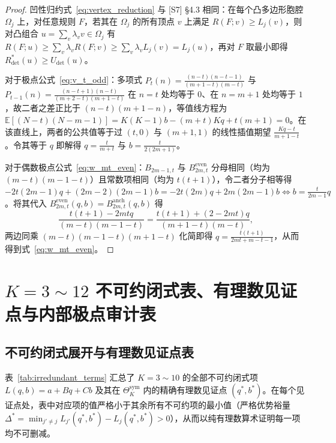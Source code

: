 \documentclass[11pt,a4paper]{article}
\theoremstyle{definition}
\theoremstyle{remark}
\newcommand{\Rdet}{R^*_{\mathrm{det}}}
\newcommand{\Thetasym}{\Theta^{\mathrm{sym}}_K}
\begin{document}
\begin{proof}
凹性归约式~\eqref{eq:vertex_reduction} 与 [S7] §4.3 相同：在每个凸多边形胞腔 $\Omega_j$ 上，对任意规则 $F$，若其在 $\Omega_j$ 的所有顶点 $v$ 上满足 $R(F; v) \ge L_j(v)$，则对凸组合 $u = \sum_v \lambda_v v \in \Omega_j$ 有 $R(F; u) \ge \sum_v \lambda_v R(F; v) \ge \sum_v \lambda_v L_j(v) = L_j(u)$，再对 $F$ 取最小即得 $\Rdet(u) \ge U_{\mathrm{det}}(u)$。

对于极点公式~\eqref{eq:v_t_odd}：多项式 $P_t(n) = \frac{(n-t)(n-t-1)}{(m+1-t)(m-t)}$ 与 $P_{t-1}(n) = \frac{(n-t+1)(n-t)}{(m+2-t)(m+1-t)}$ 在 $n = t$ 处均等于 $0$、在 $n = m+1$ 处均等于 $1$，故二者之差正比于 $(n-t)(m+1-n)$，等值线方程为 $\mathbb{E}[(N-t)(N-m-1)] = K(K-1)b - (m+t)Kq + t(m+1) = 0$。在该直线上，两者的公共值等于过 $(t, 0)$ 与 $(m+1, 1)$ 的线性插值期望 $\frac{Kq - t}{m + 1 - t}$。令其等于 $q$ 即解得 $q = \frac{t}{m+t}$ 与 $b = \frac{t}{2(2m+1)}$。

对于偶数极点公式~\eqref{eq:w_mt_even}：$B_{2m-1, t}$ 与 $B^{\mathrm{even}}_{2m, t}$ 分母相同（均为 $(m-t)(m-1-t)$）且常数项相同（均为 $t(t+1)$），令二者分子相等得 $-2t(2m-1)q + (2m-2)(2m-1)b = -2t(2m)q + 2m(2m-1)b \iff b = \frac{t}{2m-1}q$。将其代入 $B^{\mathrm{even}}_{2m, t}(q, b) = B^{\mathrm{anch}}_{2m, t}(q, b)$ 得
\[
  \frac{t(t+1) - 2mtq}{(m-t)(m-1-t)} = \frac{t(t+1) + (2 - 2mt)q}{(m+1-t)(m-t)},
\]
两边同乘 $(m-t)(m-1-t)(m+1-t)$ 化简即得 $q = \frac{t(t+1)}{2mt + m - t - 1}$，从而得到式~\eqref{eq:w_mt_even}。
\end{proof}

\section{$K = 3 \sim 12$ 不可约闭式表、有理数见证点与内部极点审计表}

\subsection{不可约闭式展开与有理数见证点表}

表~\ref{tab:irredundant_terms} 汇总了 $K = 3 \sim 10$ 的全部不可约闭式项 $L(q,b) = a + Bq + Cb$ 及其在 $\Thetasym$ 内的精确有理数见证点 $(q^*, b^*)$。在每个见证点处，表中对应项的值严格小于其余所有不可约项的最小值（严格优势裕量 $\Delta^* = \min_{j' \neq j} L_{j'}(q^*, b^*) - L_j(q^*, b^*) > 0$），从而以纯有理数算术证明每一项均不可删减。
\end{document}
